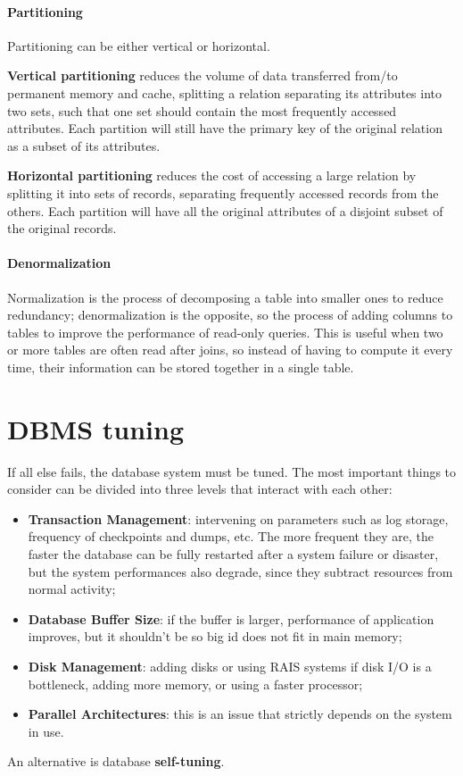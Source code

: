 \paragraph{Partitioning}

Partitioning can be either vertical or horizontal.

\textbf{Vertical partitioning} reduces the volume of data transferred from/to permanent memory and cache, splitting a relation separating its attributes into two sets, such that one set should contain the most frequently accessed attributes. Each partition will still have the primary key of the original relation as a subset of its attributes.

\textbf{Horizontal partitioning} reduces the cost of accessing a large relation by splitting it into sets of records, separating frequently accessed records from the others. Each partition will have all the original attributes of a disjoint subset of the original records.

\paragraph{Denormalization}

Normalization is the process of decomposing a table into smaller ones to reduce redundancy; denormalization is the opposite, so the process of adding columns to tables to improve the performance of read-only queries. This is useful when two or more tables are often read after joins, so instead of having to compute it every time, their information can be stored together in a single table.

\section{DBMS tuning}

If all else fails, the database system must be tuned. The most important things to consider can be divided into three levels that interact with each other:
\begin{itemize}
    \item \textbf{Transaction Management}: intervening on parameters such as log storage, frequency of checkpoints and dumps, etc. The more frequent they are, the faster the database can be fully restarted after a system failure or disaster, but the system performances also degrade, since they subtract resources from normal activity;

    \item \textbf{Database Buffer Size}: if the buffer is larger, performance of application improves, but it shouldn't be so big id does not fit in main memory;

    \item \textbf{Disk Management}: adding disks or using RAIS systems if disk I/O is a bottleneck, adding more memory, or using a faster processor;

    \item \textbf{Parallel Architectures}: this is an issue that strictly depends on the system in use.
\end{itemize}
An alternative is database \textbf{self-tuning}.